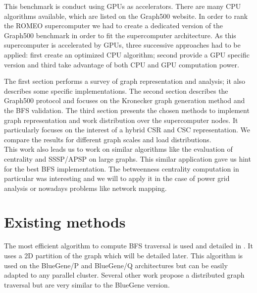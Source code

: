 This benchmark is conduct using GPUs as accelerators.
There are many CPU algorithms available, which are listed on the Graph500 website. 
In order to rank the ROMEO supercomputer we had to create a dedicated version of the Graph500 benchmark in order to fit the supercomputer architecture. 
As this supercomputer is accelerated by GPUs, three successive approaches had to be applied:  first create an optimized CPU algorithm; second provide a GPU specific version and third take advantage of both CPU and GPU computation power. 

The first section performs a survey of graph representation and analysis; it also describes some specific implementations.
The second section  describes the Graph500 protocol and focuses on the Kronecker graph generation method and the BFS validation.
The third section presents the chosen methods to implement graph representation and work distribution over the supercomputer nodes. It particularly focuses on the interest of a hybrid CSR and CSC representation.
We compare the results for different graph scales and load distributions.\\

This work also leads us to work on similar algorithms like the evaluation of centrality\cite{bader2006parallel,brandes2007centrality,brandes2001faster,geisberger2008better,jin2010novel,shi_fast_2011,sariyuce2013betweenness} and SSSP/APSP\cite{davidson2014work,djidjev_efficient_2014} on large graphs. 
This similar application gave us hint for the best BFS implementation.
The betweenness centrality computation in particular was interesting and we will to apply it in the case of power grid analysis or nowadays problems like network mapping\cite{krebs2002mapping,soman_fast_2011}. 

\section{Existing methods}
The most efficient algorithm to compute BFS traversal is used and detailed in \cite{6468459}. 
It uses a 2D partition of the graph which will be detailed later. 
This algorithm is used on the BlueGene/P and BlueGene/Q architectures but can be easily adapted to any parallel cluster.
Several other work\cite{gonzalez2012powergraph} propose a distributed graph traversal but are very similar to the BlueGene version.

